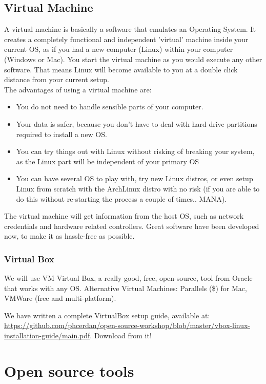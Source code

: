 \documentclass[a4paper]{article}
\begin{document}
\subsection{Virtual Machine}
A virtual machine is basically a software that emulates an Operating System. It creates a completely functional and independent 'virtual' machine inside your current OS, as if you had a new computer (Linux) within your computer (Windows or Mac). You start the virtual machine as you would execute any other software. That means Linux will become available to you at a double click distance from your current setup. \\
The advantages of using a virtual machine are:
\begin{itemize}
\item You do not need to handle sensible parts of your computer.
\item Your data is safer, because you don't have to deal with hard-drive partitions required to install a new OS.
\item You can try things out with Linux without risking of breaking your system, as the Linux part will be independent of your primary OS
\item You can have several OS to play with, try new Linux distros, or even setup Linux from scratch with the ArchLinux distro with no risk (if you are able to do this without re-starting the process a couple of times.. MANA).
\end{itemize}

The virtual machine will get information from the host OS, such as network credentials and hardware related controllers. Great software have been developed now, to make it as hassle-free as possible.\\

\subsubsection{Virtual Box}
We will use VM Virtual Box, a really good, free, open-source, tool from Oracle that works with any OS. Alternative Virtual Machines: Parallels (\$) for Mac, VMWare (free and multi-platform).

We have written a complete VirtualBox setup guide, available at: \url{https://github.com/phcerdan/open-source-workshop/blob/master/vbox-linux-installation-guide/main.pdf}. Download from it!

\section{Open source tools}
\end{document}
